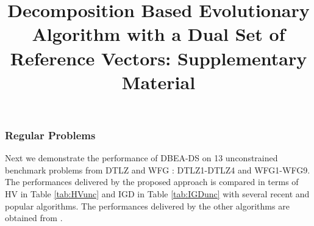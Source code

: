\documentclass[conference]{IEEEtran}
\begin{document}
 
\title{Decomposition Based Evolutionary Algorithm with a Dual Set of Reference Vectors: Supplementary Material}

\author{


}

\IEEEpeerreviewmaketitle
\maketitle

\thispagestyle{plain}

 
\subsubsection{Regular Problems}

Next we demonstrate the performance of DBEA-DS on 13 unconstrained benchmark problems from DTLZ \cite{deb2005scalable} and WFG \cite{huband2005scalable}: DTLZ1-DTLZ4 and WFG1-WFG9. The performances delivered by the proposed approach is compared in terms of HV in Table \ref{tab:HVunc} and IGD in Table \ref{tab:IGDunc} with several recent and popular algorithms. The performances delivered by the other algorithms are obtained from \cite{ishibuchi2016inverse}.  
\end{document}
